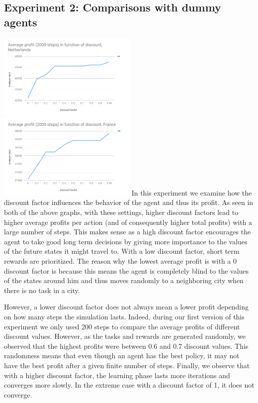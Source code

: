 \documentclass[11pt]{article}
\begin{document}
\subsection{Experiment 2: Comparisons with dummy agents}
 \includegraphics[width=0.5\textwidth]{netherlands.png}
 \includegraphics[width=0.5\textwidth]{france.png}
In this experiment we examine how the discount factor influences the behavior of the agent and thus its profit. As seen in both of the above graphs, with these settings, higher discount factors lead to higher average profits per action (and of consequently higher total profits) with a large number of steps. This makes sense as a high discount factor encourages the agent to take good long term decisions by giving more importance to the values of the future states it might travel to. With a low discount factor, short term rewards are prioritized. The reason why the lowest average profit is with a 0 discount factor is because this means the agent is completely blind to the values of the states around him and thus moves randomly to a neighboring city when there is no task in a city. 

However, a lower discount factor does not always mean a lower profit depending on how many steps the simulation lasts. Indeed, during our first version of this experiment we only used 200 steps to compare the average profits of different discount values. However, as the tasks and rewards are generated randomly, we observed that the highest profits were between 0.6 and 0.7 discount values. This randomness means that even though an agent has the best policy, it may not have the best profit after a given finite number of steps.
Finally, we observe that with a higher discount factor, the learning phase lasts more iterations and converges more slowly. In the extreme case with a discount factor of 1, it does not converge.
\end{document}
